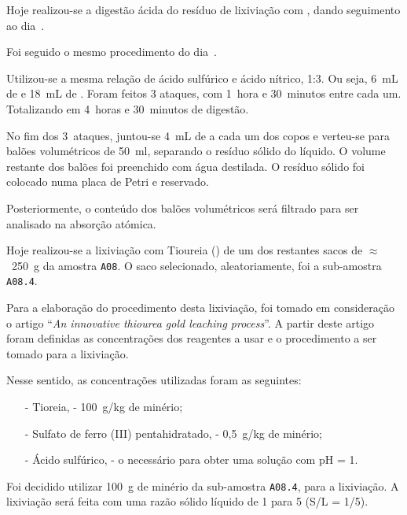 Hoje realizou-se a digestão ácida do resíduo de lixiviação com \TSP{}, dando seguimento ao dia~.

Foi seguido o mesmo procedimento do dia~.

Utilizou-se a mesma relação de ácido sulfúrico e ácido nítrico, 1:3.
Ou seja, 6~mL de  e 18~mL de .
Foram feitos 3 ataques, com 1~hora e 30~minutos entre cada um.
Totalizando em 4~horas e 30~minutos de digestão.

No fim dos 3~ataques, juntou-se 4~mL de  a cada um dos copos e verteu-se para balões volumétricos de 50~ml, separando o resíduo sólido do líquido.
O volume restante dos balões foi preenchido com água destilada.
O resíduo sólido foi colocado numa placa de Petri e reservado.

Posteriormente, o conteúdo dos balões volumétricos será filtrado para ser analisado na absorção atómica.

\hrulefill


\label{day:22-novembro-2024}

Hoje realizou-se a lixiviação com Tioureia (\tio{}) de um dos restantes sacos de $\approx$~250~g da amostra \texttt{A08}.
O saco selecionado, aleatoriamente, foi a sub-amostra \texttt{A08.4}.

Para a elaboração do procedimento desta lixiviação, foi tomado em consideração o artigo ``\emph{An innovative thiourea gold leaching process}''\cite{innovative_thiourea_1998}.
A partir deste artigo foram definidas as concentrações dos reagentes a usar e o procedimento a ser tomado para a lixiviação.

Nesse sentido, as concentrações utilizadas foram as seguintes:
\begin{itemize}
    \item[-] Tioreia, \tio{} - 100~g/kg de minério;
    \item[-] Sulfato de ferro (III) pentahidratado, \sulfe{} - 0,5~g/kg de minério;
    \item[-] Ácido sulfúrico, \acsul{} - o necessário para obter uma solução com pH = 1.
\end{itemize}

Foi decidido utilizar 100~g de minério da sub-amostra \texttt{A08.4}, para a lixiviação. 
A lixiviação será feita com uma razão sólido líquido de 1 para 5 (S/L = 1/5).

